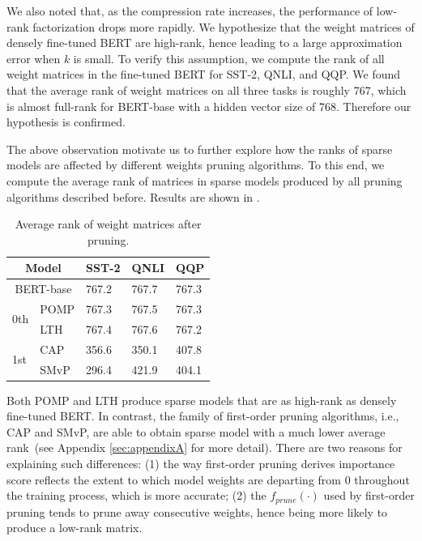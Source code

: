 We also noted that, as the compression rate increases, the performance of low-rank factorization drops more rapidly. 
We hypothesize that the weight matrices of densely fine-tuned BERT are high-rank, 
hence leading to a large approximation error when $k$ is small. 
To verify this assumption, we compute the rank of all weight matrices in the 
fine-tuned BERT for SST-2, QNLI, and QQP. We found that the average rank of weight matrices 
on all three tasks is roughly 767, which is almost full-rank 
for BERT-base with a hidden vector size of 768. Therefore our hypothesis is confirmed.

The above observation motivate us to further explore how the ranks of sparse models 
are affected by different weights pruning algorithms. To this end, we compute the average rank 
of matrices in sparse models produced by all pruning algorithms described before. 
Results are shown in .
\begin{table}[th]
	\centering
	\scriptsize
	\begin{tabular}{l|l|lll}
		\toprule
		\multicolumn{2}{c|}{Model}                          & SST-2       & QNLI          & QQP           \\
		\midrule
		\multicolumn{2}{c|}{BERT-base}                           & 767.2        & 767.7          & 767.3          \\
		\midrule
		\multirow{2}{*}{0th}                      & POMP & 767.3 & 767.5 & 767.3 \\
		& LTH  & 767.4 & 767.6   & 767.2  \\
		\midrule
		\multirow{2}{*}{1st} & CAP  & 356.6 & 350.1  & 407.8  \\
		& SMvP & 296.4& 421.9  & 404.1  \\
		\bottomrule
	\end{tabular}
	\caption{Average rank of weight matrices after pruning.}
	\label{table:rank}
\end{table}

Both POMP and LTH produce sparse models that are 
as high-rank as densely fine-tuned BERT. In contrast, the family of first-order pruning algorithms, 
i.e., CAP and SMvP, are able to obtain sparse model with a much lower average rank~(see Appendix \ref{sec:appendixA} for more detail). 
There are two reasons for explaining such differences: (1) the way first-order pruning derives importance score reflects the extent to which model weights are departing from 0 throughout the training process, which is more accurate; (2) the $f_{prune}(\cdot)$ used by first-order pruning tends to prune away consecutive weights, hence being more likely to produce a low-rank matrix.

